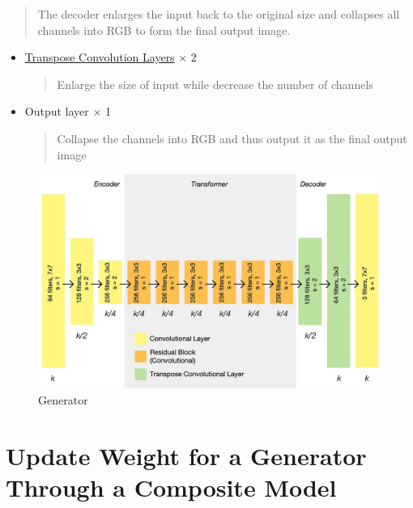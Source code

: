 \documentclass[
]{article}
\begin{document}
\begin{itemize}
  \begin{quote}
  The decoder enlarges the input back to the original size and collapses
  all channels into RGB to form the final output image.
  \end{quote}

  \begin{itemize}
  \item
    \href{https://machinelearningmastery.com/upsampling-and-transpose-convolution-layers-for-generative-adversarial-networks/}{Transpose
    Convolution Layers} × 2

    \begin{quote}
    Enlarge the size of input while decrease the number of channels
    \end{quote}
  \item
    Output layer × 1

    \begin{quote}
    Collapse the channels into RGB and thus output it as the final
    output image
    \end{quote}
  \end{itemize}
\end{itemize}

\begin{figure}
\centering
\includegraphics{./assets/Generator.png}
\caption{Generator}
\end{figure}

\hypertarget{update-weight-for-a-generator-through-a-composite-model}{%
\section{Update Weight for a Generator Through a Composite
Model}\label{update-weight-for-a-generator-through-a-composite-model}}
\end{document}
